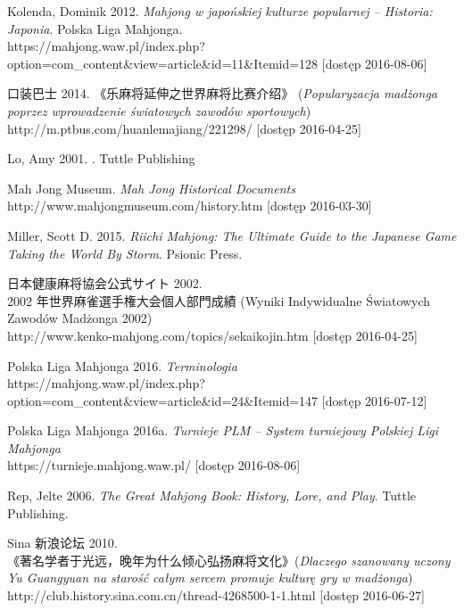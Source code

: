 Kolenda, Dominik 2012. \textit{Mahjong w japońskiej kulturze popularnej --
Historia: Japonia}. Polska Liga Mahjonga.
\\https://mahjong.waw.pl/index.php?option=com\_content\&view=article\&id=11\&Itemid=128
[dostęp 2016-08-06]

 口装巴士 2014.  《乐麻将延伸之世界麻将比赛介绍》
(\textit{Popularyzacja madżonga poprzez wprowadzenie światowych zawodów
sportowych}) \\http://m.ptbus.com/huanlemajiang/221298/ [dostęp 2016-04-25]

Lo, Amy 2001. . Tuttle
Publishing

Mah Jong Museum. \textit{Mah Jong Historical Documents}
\\http://www.mahjongmuseum.com/history.htm [dostęp
2016-03-30]

Miller, Scott D. 2015. \textit{Riichi Mahjong: The Ultimate Guide to the
Japanese Game Taking the World By Storm}. Psionic Press.

 日本健康麻将協会公式サイト  2002.
\\ 2002 年世界麻雀選手権大会個人部門成績 (Wyniki
Indywidualne Światowych Zawodów Madżonga 2002)
\\http://www.kenko-mahjong.com/topics/sekaikojin.htm [dostęp 2016-04-25]

Polska Liga Mahjonga 2016. \textit{Terminologia}
\\
https://mahjong.waw.pl/index.php?option=com\_content\&view=article\&id=24\&Itemid=147
[dostęp 2016-07-12]

Polska Liga Mahjonga 2016a. \textit{Turnieje PLM -- System turniejowy Polskiej
Ligi Mahjonga} \\https://turnieje.mahjong.waw.pl/ [dostęp 2016-08-06]

Rep, Jelte 2006. \textit{The Great Mahjong Book: History, Lore, and Play}.
Tuttle Publishing. %

Sina  新浪论坛 2010.  \\
《著名学者于光远，晚年为什么倾心弘扬麻将文化》(\textit{Dlaczego szanowany uczony Yu Guangyuan na
starość całym sercem promuje kulturę gry w madżonga})
\\http://club.history.sina.com.cn/thread-4268500-1-1.html [dostęp 2016-06-27]

